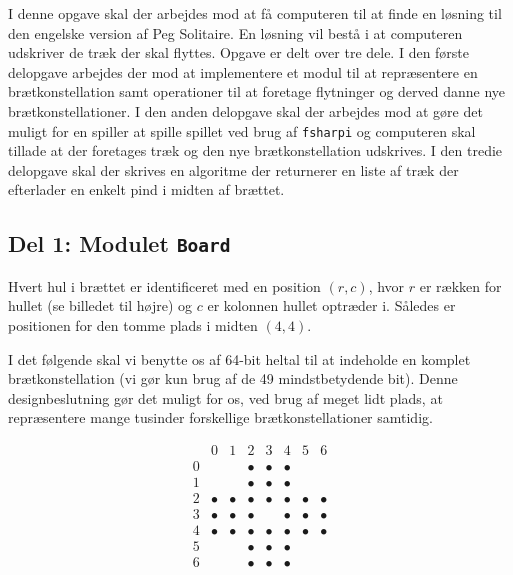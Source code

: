 

I denne opgave skal der arbejdes mod at få computeren til at finde en
løsning til den engelske version af Peg Solitaire. En løsning vil
bestå i at computeren udskriver de træk der skal flyttes. Opgave er
delt over tre dele. I den første delopgave arbejdes der mod at
implementere et modul til at repræsentere en brætkonstellation samt
operationer til at foretage flytninger og derved danne nye
brætkonstellationer. I den anden delopgave skal der arbejdes mod at
gøre det muligt for en spiller at spille spillet ved brug
af \texttt{fsharpi} og computeren skal tillade at der foretages træk
og den nye brætkonstellation udskrives. I den tredie delopgave skal
der skrives en algoritme der returnerer en liste af træk der
efterlader en enkelt pind i midten af brættet.

\subsection*{Del 1: Modulet \lstinline{Board}}
\begin{minipage}{.65\textwidth}
Hvert hul i brættet er identificeret med en position $(r,c)$, hvor $r$
er rækken for hullet (se billedet til højre) og $c$ er kolonnen hullet
optræder i. Således er positionen for den tomme plads i midten
$(4,4)$.

I det følgende skal vi benytte os af 64-bit heltal til at indeholde en
komplet brætkonstellation (vi gør kun brug af de 49 mindstbetydende
bit). Denne designbeslutning gør det muligt for os, ved brug af meget
lidt plads, at repræsentere mange tusinder forskellige
brætkonstellationer samtidig.
\end{minipage}
\begin{minipage}{.3\textwidth}
\[
\begin{array}{r|c|c|c|c|c|c|c}
  & 0 & 1 & 2 & 3 & 4 & 5 & 6 \\ \hline
0 & & & \bullet & \bullet & \bullet & & \\ \hline
1 & & & \bullet & \bullet & \bullet & & \\ \hline
2 & \bullet & \bullet & \bullet & \bullet & \bullet & \bullet & \bullet \\ \hline
3 & \bullet & \bullet & \bullet &  & \bullet & \bullet & \bullet \\ \hline
4 & \bullet & \bullet & \bullet & \bullet & \bullet & \bullet & \bullet \\ \hline
5 & & & \bullet & \bullet & \bullet & & \\ \hline
6 & & & \bullet & \bullet & \bullet & &
\end{array}
\]
\end{minipage}


